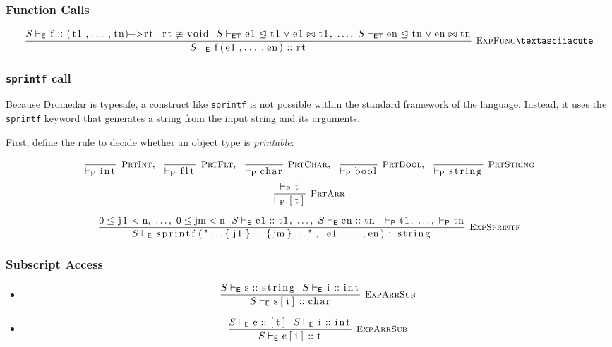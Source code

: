\documentclass{article}
\newcommand{\code}[1]{\lstinline[columns=fixed]{#1}}
\newcommand{\drmrule}[5]{\frac{#1}{#2\vdash_{\mathsf{#3}}#4}\textsc{\ \small{#5}}}
\newcommand{\ruleapp}[1]{\vdash_{\mathsf{#1}}}
\newcommand{\mc}[1]{\textnormal{\code{#1}}}
\begin{document}
			\subsubsection{Function Calls}
			
				\begin{align*}
					\drmrule{S\ruleapp{E}\mc{f}::\mc{(t1,...,tn)->rt}\ \ \mc{rt}\not\equiv\mc{void}\ \  S\ruleapp{ET}\mc{e1}\trianglelefteq\mc{t1}\vee\mc{e1}\bowtie\mc{t1},\ \dots,\ S\ruleapp{ET}\mc{en}\trianglelefteq\mc{tn}\vee\mc{en}\bowtie\mc{tn}}{S}{E}{\mc{f(e1,...,en)}::\mc{rt}}{ExpFunc}´
				\end{align*}
				
			\subsubsection{\code{sprintf} call}
			
				Because Dromedar is typesafe, a construct like \code{sprintf} is not possible within the standard framework of the language. Instead, it uses the \code{sprintf} keyword that generates a string from the input string and its arguments.
				
				First, define the rule to decide whether an object type is \textit{printable}:
				
				\begin{align*}
					\drmrule{}{}{P}{\mc{int}}{PrtInt},\ \ 
					\drmrule{}{}{P}{\mc{flt}}{PrtFlt},\ \ 
					\drmrule{}{}{P}{\mc{char}}{PrtChar},\ \ 
					\drmrule{}{}{P}{\mc{bool}}{PrtBool},\ \ 
					\drmrule{}{}{P}{\mc{string}}{PrtString}
				\end{align*}\begin{align*}
					\drmrule{\ruleapp{P}\mc{t}}{}{P}{\mc{[t]}}{PrtArr}
				\end{align*}
				
				\begin{align*}
					\drmrule{0\leq\mc{j1}<\mc{n},\ \dots,\ 0\leq\mc{jm}<\mc{n}\ \ S\ruleapp{E}\mc{e1}::\mc{t1},\ \dots,\ S\ruleapp{E}\mc{en}::\mc{tn}\ \ \ruleapp{P}\mc{t1},\ \dots,\ \ruleapp{P}\mc{tn}}{S}{E}{\mc{sprintf("...\{j1\}...\{jm\}...", e1,...,en)} :: \mc{string}}{ExpSprintf}
				\end{align*}
				
			\subsubsection{Subscript Access}
			
				\begin{itemize}
					\item
						\begin{align*}
							\drmrule{S\ruleapp{E}\mc{s}::\mc{string}\ \ S\ruleapp{E}\mc{i}::\mc{int}}{S}{E}{\mc{s[i]} :: \mc{char}}{ExpArrSub}
						\end{align*}
					\item
						\begin{align*}
							\drmrule{S\ruleapp{E}\mc{e}::\mc{[t]}\ \ S\ruleapp{E}\mc{i}::\mc{int}}{S}{E}{\mc{e[i]} :: \mc{t}}{ExpArrSub}
						\end{align*}
				\end{itemize}
			
\end{document}
